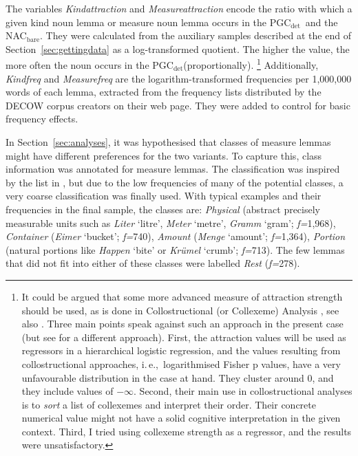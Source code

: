 \documentclass[USenglish]{article}
\newcommand{\ie}{i.\,e.,}
\newcommand{\Sub}[1]{\ensuremath{\mathrm{_{#1}}}}
\newcommand{\NACb}{NAC\Sub{bare}}
\newcommand{\PGCd}{PGC\Sub{det}}
\begin{document}
The variables \textit{Kindattraction} and \textit{Measureattraction} encode the ratio with which a given kind noun lemma or measure noun lemma occurs in the \PGCd\ and the  \NACb.
They were calculated from the auxiliary samples described at the end of Section~\ref{sec:gettingdata} as a log-transformed quotient.
The higher the value, the more often the noun occurs in the \PGCd (proportionally).%
\footnote{
  It could be argued that some more advanced measure of attraction strength should be used, as is done in Collostructional (or Collexeme) Analysis \citep{GriesStefanowitsch2004}, see also \cite{Gries2015a}.
  Three main points speak against such an approach in the present case (but see \citealp[246--249]{Levshina2016} for a different approach).
  First, the attraction values will be used as regressors in a hierarchical logistic regression, and the values resulting from collostructional approaches, \ie\ logarithmised Fisher p values, have a very unfavourable distribution in the case at hand.
  They cluster around 0, and they include values of $-\infty$.
  Second, their main use in collostructional analyses is to \textit{sort} a list of collexemes and interpret their order.
  Their concrete numerical value might not have a solid cognitive interpretation in the given context.
  Third, I tried using collexeme strength as a regressor, and the results were unsatisfactory.
}
Additionally, \textit{Kindfreq} and \textit{Measurefreq} are the logarithm-transformed frequencies per 1,000,000 words of each lemma, extracted from the frequency lists distributed by the DECOW corpus creators on their web page.
They were added to control for basic frequency effects.

In Section~\ref{sec:analyses}, it was hypothesised that classes of measure lemmas might have different preferences for the two variants.
To capture this, class information was annotated for measure lemmas.
The classification was inspired by the list in \citet[530]{Koptjevskaja2001}, but due to the low frequencies of many of the potential classes, a very coarse classification was finally used.
With typical examples and their frequencies in the final sample, the classes are:
\textit{Physical} (abstract precisely measurable units such as \textit{Liter} `litre', \textit{Meter} `metre', \textit{Gramm} `gram'; \textit{f=}1,968),
\textit{Container} (\textit{Eimer} `bucket'; \textit{f=}740),
\textit{Amount} (\textit{Menge} `amount'; \textit{f=}1,364), 
\textit{Portion} (natural portions like \textit{Happen} `bite' or \textit{Krümel} `crumb'; \textit{f=}713).
The few lemmas that did not fit into either of these classes were labelled \textit{Rest} (\textit{f=}278).
\end{document}
